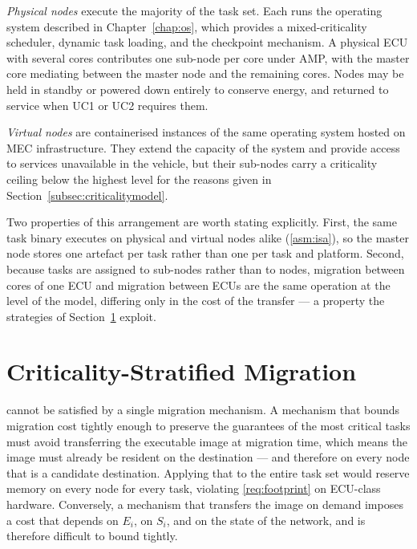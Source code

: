 \emph{Physical nodes} execute the majority of the task set. Each runs the
operating system described in Chapter~\ref{chap:os}, which provides a
mixed-criticality scheduler, dynamic task loading, and the checkpoint
mechanism. A physical ECU with several cores contributes one sub-node per core
under AMP, with the master core mediating between the master node and the
remaining cores. Nodes may be held in standby or powered down entirely to
conserve energy, and returned to service when UC1 or UC2 requires them.

\emph{Virtual nodes} are containerised instances of the same operating system
hosted on MEC infrastructure. They extend the capacity of the system and
provide access to services unavailable in the vehicle, but their sub-nodes
carry a criticality ceiling below the highest level for the reasons given in
Section~\ref{subsec:criticalitymodel}.

Two properties of this arrangement are worth stating explicitly. First, the
same task binary executes on physical and virtual nodes alike
(\cref{asm:isa}), so the master node stores one artefact per task rather than
one per task and platform. Second, because tasks are assigned to
sub-nodes rather than to nodes, migration between cores of one ECU and
migration between ECUs are the same operation at the level of the model,
differing only in the cost of the transfer --- a property the strategies of
Section~\ref{sec:strategyoverview} exploit.

\section{Criticality-Stratified Migration}\label{sec:strategyoverview}

 cannot be satisfied by a single
migration mechanism. A mechanism that bounds migration cost tightly enough to
preserve the guarantees of the most critical tasks must avoid transferring the
executable image at migration time, which means the image must already be
resident on the destination --- and therefore on every node that is a candidate
destination. Applying that to the entire task set would reserve memory on every
node for every task, violating \cref{req:footprint} on ECU-class hardware.
Conversely, a mechanism that transfers the image on demand imposes a cost that
depends on $E_i$, on $S_i$, and on the state of the network, and is therefore
difficult to bound tightly.

